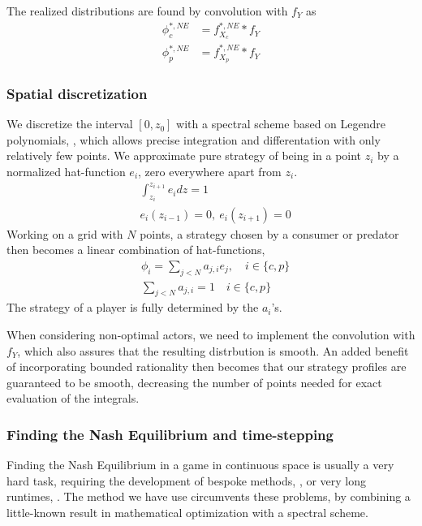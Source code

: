 The realized distributions are found by convolution with $f_Y$ as
\begin{align*}
  \phi_c^{*,NE} &= f_{X_c}^{*,NE} * f_Y \\
  \phi_p^{*,NE} &= f_{X_p}^{*,NE} * f_Y
\end{align*}

\subsubsection*{Spatial discretization}
We discretize the interval $[0,z_0]$ with a spectral scheme based on Legendre polynomials, \citep{kopriva2009implementing}, which allows precise integration and differentation with only relatively few points.
We approximate pure strategy of being in a point $z_i$  by a normalized hat-function $e_i$, zero everywhere apart from $z_i$.
\begin{align*}
	& \int_{z_i}^{z_{i+1}} e_i dz = 1 \\
	&e_i(z_{i-1}) = 0,~ e_i(z_{i+1}) = 0
\end{align*}
Working on a grid with $N$ points, a strategy chosen by a consumer or predator then becomes a linear combination of hat-functions,
\begin{align*}
  &\phi_{i} = \sum_{j<N} a_{j,i} e_j, \quad i\in \{c,p\} \\
  &\sum_{j<N} a_{j,i} = 1 \quad i\in \{c,p\}
\end{align*}
The strategy of a player is fully determined by the $a_i$'s.

When considering non-optimal actors, we need to implement the convolution with $f_Y$, which also assures that the resulting distrbution is smooth. An added benefit of incorporating bounded rationality then becomes that our strategy profiles are guaranteed to be smooth, decreasing the number of points needed for exact evaluation of the integrals.


\subsubsection*{Finding the Nash Equilibrium and time-stepping}
Finding the Nash Equilibrium in a game in continuous space is usually a very hard task, requiring the development of bespoke methods, \citep{verticalmigration}, or very long runtimes, \citep{jerome}. The method we have use circumvents these problems, by combining a little-known result in mathematical optimization with a spectral scheme.

